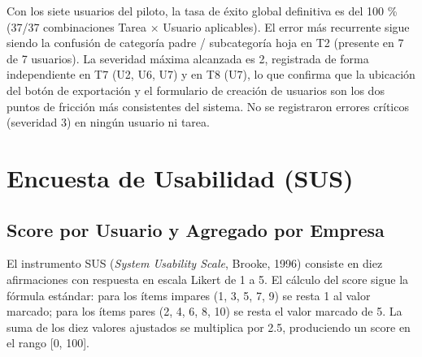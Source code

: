 Con los siete usuarios del piloto, la tasa de éxito global definitiva es del 100 \% (37/37 combinaciones Tarea × Usuario aplicables). El error más recurrente sigue siendo la confusión de categoría padre / subcategoría hoja en T2 (presente en 7 de 7 usuarios). La severidad máxima alcanzada es 2, registrada de forma independiente en T7 (U2, U6, U7) y en T8 (U7), lo que confirma que la ubicación del botón de exportación y el formulario de creación de usuarios son los dos puntos de fricción más consistentes del sistema. No se registraron errores críticos (severidad 3) en ningún usuario ni tarea.

\section{Encuesta de Usabilidad (SUS)}\label{encuesta-de-usabilidad-sus}

\subsection{Score por Usuario y Agregado por Empresa}\label{score-por-usuario-y-agregado-por-empresa}

El instrumento SUS (\emph{System Usability Scale}, Brooke, 1996) consiste en diez afirmaciones con respuesta en escala Likert de 1 a 5. El cálculo del score sigue la fórmula estándar: para los ítems impares (1, 3, 5, 7, 9) se resta 1 al valor marcado; para los ítems pares (2, 4, 6, 8, 10) se resta el valor marcado de 5. La suma de los diez valores ajustados se multiplica por 2.5, produciendo un score en el rango {[}0, 100{]}.


